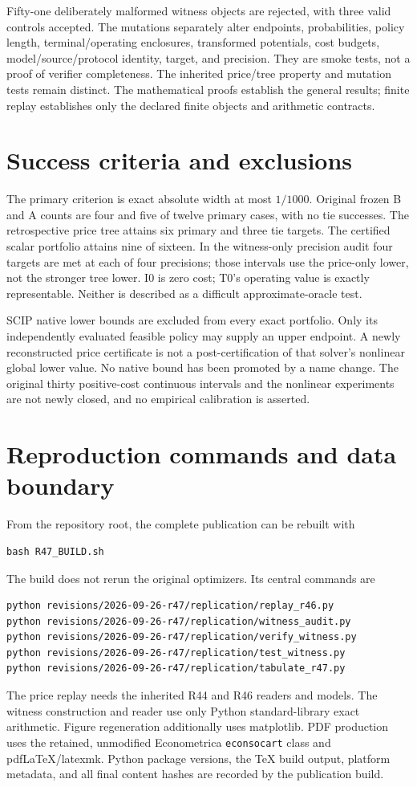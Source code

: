 Fifty-one deliberately malformed witness objects are rejected, with three valid controls accepted. The mutations separately alter endpoints, probabilities, policy length, terminal/operating enclosures, transformed potentials, cost budgets, model/source/protocol identity, target, and precision. They are smoke tests, not a proof of verifier completeness. The inherited price/tree property and mutation tests remain distinct. The mathematical proofs establish the general results; finite replay establishes only the declared finite objects and arithmetic contracts.

\section{Success criteria and exclusions}
The primary criterion is exact absolute width at most $1/1000$. Original frozen B and A counts are four and five of twelve primary cases, with no tie successes. The retrospective price tree attains six primary and three tie targets. The certified scalar portfolio attains nine of sixteen. In the witness-only precision audit four targets are met at each of four precisions; those intervals use the price-only lower, not the stronger tree lower. I0 is zero cost; T0's operating value is exactly representable. Neither is described as a difficult approximate-oracle test.

SCIP native lower bounds are excluded from every exact portfolio. Only its independently evaluated feasible policy may supply an upper endpoint. A newly reconstructed price certificate is not a post-certification of that solver's nonlinear global lower value. No native bound has been promoted by a name change. The original thirty positive-cost continuous intervals and the nonlinear experiments are not newly closed, and no empirical calibration is asserted.

\section{Reproduction commands and data boundary}
From the repository root, the complete publication can be rebuilt with
\begin{verbatim}
bash R47_BUILD.sh
\end{verbatim}
The build does not rerun the original optimizers. Its central commands are
\begin{verbatim}
python revisions/2026-09-26-r47/replication/replay_r46.py
python revisions/2026-09-26-r47/replication/witness_audit.py
python revisions/2026-09-26-r47/replication/verify_witness.py
python revisions/2026-09-26-r47/replication/test_witness.py
python revisions/2026-09-26-r47/replication/tabulate_r47.py
\end{verbatim}
The price replay needs the inherited R44 and R46 readers and models. The witness construction and reader use only Python standard-library exact arithmetic. Figure regeneration additionally uses matplotlib. PDF production uses the retained, unmodified Econometrica \texttt{econsocart} class and pdfLaTeX/latexmk. Python package versions, the TeX build output, platform metadata, and all final content hashes are recorded by the publication build.

